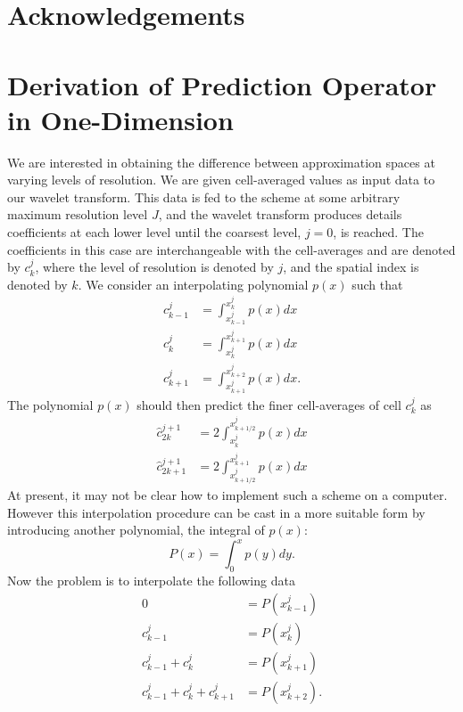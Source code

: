 \documentclass[12pt,letterpaper]{article}
\begin{document}
\section{Acknowledgements}

\appendix

\section{Derivation of Prediction Operator in One-Dimension}
We are interested in obtaining the difference between approximation spaces at varying levels of resolution. We 
are given cell-averaged values as input data to our wavelet transform. This data is fed to the scheme at some arbitrary maximum
resolution level $J$, and the wavelet transform produces details coefficients at each lower level until the coarsest level,
$j=0$, is reached. The coefficients in this case are interchangeable with the cell-averages and are denoted by $c^{j}_{k}$,
where the level of resolution is denoted by $j$, and the spatial index is denoted by $k$. We consider an interpolating
polynomial $p(x)$ such that 
\begin{align}
    c^{j}_{k-1} &= \int_{x^{j}_{k-1}}^{x^{j}_{k}} p(x) dx \\
    c^{j}_{k} &= \int_{x^{j}_{k}}^{x^{j}_{k+1}} p(x) dx \\
    c^{j}_{k+1} &= \int_{x^{j}_{k+1}}^{x^{j}_{k+2}} p(x) dx.
\end{align}
The polynomial $p(x)$ should then predict the finer cell-averages of cell $c^{j}_{k}$ as
\begin{align}
    \hat{c}^{j+1}_{2k} &= 2 \int_{x^{j}_{k}}^{x^{j}_{k+1/2}} p(x) dx \\
    \hat{c}^{j+1}_{2k+1} &= 2 \int_{x^{j}_{k+1/2}}^{x^{j}_{k+1}} p(x) dx
\end{align}
At present, it may not be clear how to implement such a scheme on a computer. However this interpolation procedure
can be cast in a more suitable form by introducing another polynomial, the integral of $p(x)$:
\begin{equation}
	P(x) = \int_{0}^{x} p(y) dy.
\end{equation}
Now the problem is to interpolate the following data
\begin{align}
    0 &= P(x^{j}_{k-1}) \\
    c^{j}_{k-1} &= P(x^{j}_{k}) \\
    c^{j}_{k-1} + c^{j}_{k} &= P(x^{j}_{k+1}) \\
    c^{j}_{k-1} + c^{j}_{k} + c^{j}_{k+1} &= P(x^{j}_{k+2}).
\end{align}
\end{document}
